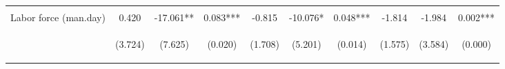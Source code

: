 \begin{center}
\begin{tabular}{lccccccccc}
\vspace{4pt} & \begin{footnotesize}[0.922]\end{footnotesize} & \begin{footnotesize}[0.007]\end{footnotesize} & \begin{footnotesize}[0.000]\end{footnotesize} & \begin{footnotesize}[0.470]\end{footnotesize} & \begin{footnotesize}[0.210]\end{footnotesize} & \begin{footnotesize}[0.559]\end{footnotesize} & \begin{footnotesize}[0.785]\end{footnotesize} & \begin{footnotesize}[0.019]\end{footnotesize} & \begin{footnotesize}[0.000]\end{footnotesize} \\
Labor force (man.day) & 0.420 & -17.061** & 0.083*** & -0.815 & -10.076* & 0.048*** & -1.814 & -1.984 & 0.002*** \\
 & \begin{footnotesize}(3.724)\end{footnotesize} & \begin{footnotesize}(7.625)\end{footnotesize} & \begin{footnotesize}(0.020)\end{footnotesize} & \begin{footnotesize}(1.708)\end{footnotesize} & \begin{footnotesize}(5.201)\end{footnotesize} & \begin{footnotesize}(0.014)\end{footnotesize} & \begin{footnotesize}(1.575)\end{footnotesize} & \begin{footnotesize}(3.584)\end{footnotesize} & \begin{footnotesize}(0.000)\end{footnotesize} \\

\end{tabular}
\end{center}
